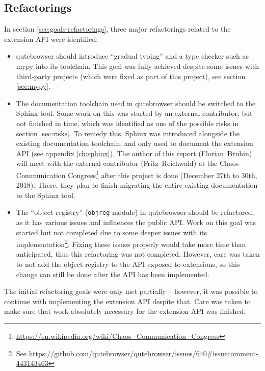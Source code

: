 \subsection{Refactorings}
In section \ref{sec:goals-refactorings}, three major refactorings related to the
extension API were identified:

\begin{itemize}
  \item qutebrowser should introduce ``gradual typing'' and a type checker such
    as mypy into its toolchain. This goal was fully achieved despite some issues
    with third-party projects (which were fixed as part of this project), see
    section \ref{sec:mypy}.
  \item The documentation toolchain used in qutebrowser should be switched to
    the Sphinx tool. Some work on this was started by an external contributor,
    but not finished in time, which was identified as one of the possible risks
    in section \ref{sec:risks}. To remedy this, Sphinx was introduced alongside
    the existing documentation toolchain, and only used to document the
    extension API (see appendix \ref{ch:sphinx}). The author of this report
    (Florian~Bruhin) will meet with the external contributor (Fritz~Reichwald)
    at the  Chaos Communication
    Congress\footnote{\url{https://en.wikipedia.org/wiki/Chaos_Communication_Congress}}
    after this project is done (December 27th to 30th, 2018).
    There, they plan to finish migrating the entire existing documentation to
    the Sphinx tool.
  \item The ``object registry'' (\texttt{objreg} module) in qutebrowser should
    be refactored, as it has various issues and influences the public API. Work
    on this goal was started but not completed due to some deeper issues with
    its implementation\footnote{See \url{https://github.com/qutebrowser/qutebrowser/issues/640\#issuecomment-443143463}}.
    Fixing these issues properly would take more time than anticipated, thus this
    refactoring was not completed. However, care was taken to not add the object
    registry to the API exposed to extensions, so this change can still be done
    after the API has been implemented.
\end{itemize}

The initial refactoring goals were only met partially -- however, it was
possible to continue with implementing the extension API despite that. Care was
taken to make sure that work absolutely necessary for the extension API was
finished.

